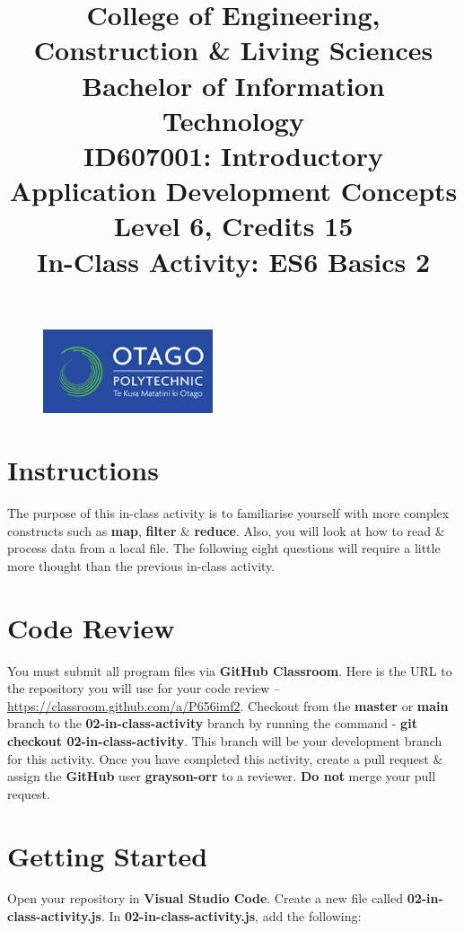 \documentclass{article}
\author{}
\begin{document}
\begin{figure}
  \centering
  \includegraphics[width=50mm]{../img/logo.png}
\end{figure}

\title{College of Engineering, Construction \& Living Sciences\\Bachelor of Information Technology\\ID607001: Introductory Application Development Concepts\\Level 6, Credits 15\\\textbf{In-Class Activity: ES6 Basics 2}}
\date{}
\maketitle

\section*{Instructions}
The purpose of this in-class activity is to familiarise yourself with more complex constructs such as \textbf{map}, \textbf{filter} \& \textbf{reduce}. Also, you will look at how to read \& process data from a local file. The following eight questions will require a little more thought than the previous in-class activity.

\section*{Code Review}
You must submit all program files via \textbf{GitHub Classroom}. Here is the URL to the repository you will use for your code review – \href{https://classroom.github.com/a/P656imf2}{https://classroom.github.com/a/P656imf2}. Checkout from the \textbf{master} or \textbf{main} branch to the \textbf{02-in-class-activity} branch by running the command - \textbf{git checkout 02-in-class-activity}. This branch will be your development branch for this activity. Once you have completed this activity, create a pull request \& assign the \textbf{GitHub} user \textbf{grayson-orr} to a reviewer. \textbf{Do not} merge your pull request.

\section*{Getting Started}
Open your repository in \textbf{Visual Studio Code}. Create a new file called \textbf{02-in-class-activity.js}. In \textbf{02-in-class-activity.js}, add the following: 
\end{document}
